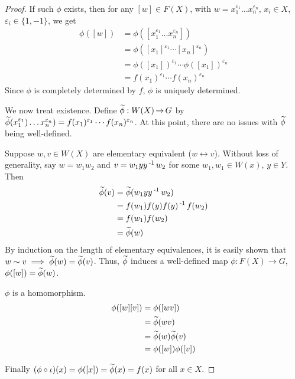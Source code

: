 \documentclass[11pt]{book}
\theoremstyle{definition}   \newtheorem{defn}[counter]{Definition} %
\newcommand{\ve}{\varepsilon}   \newcommand{\im}{\textnormal{im }}   \newcommand{\re}{\textnormal{Re }}   \newcommand{\mb}[1]{\mathbf{#1}}
\newcommand{\lra}{\leftrightarrow}   \newcommand{\0}{\mathbf{0}}   \newcommand{\mc}[1]{\mathcal{#1}}   \newcommand{\hra}{\hookrightarrow}   \newcommand{\hla}{\hookleftarrow}
\DeclareMathOperator{\ra}{\rightarrow}   \DeclareMathOperator{\Poly}{\mathbf{P}}   \DeclareMathOperator{\spn}{\textnormal{span}}   \DeclareMathOperator{\aut}{\textnormal{Aut}}
\newcommand{\vs}{\vspace{8pt}}
\numberwithin{counter}{chapter}
\begin{document}
\begin{proof}
If such $\phi$ exists, then for any $[w] \in F(X)$, with $w = x_1^{\ve_1} \dots x_n^{\ve_n}$, $x_i \in X$, $\ve_i \in \{1,-1\}$, we get
	\begin{align*}
	\phi([w]) &= \phi([x_1^{\ve_1} \dots x_n^{\ve_n}]) \\
	&= \phi([x_1]^{\ve_1} \cdots [x_n]^{\ve_n}) \\
	&= \phi([x_1])^{\ve_1} \cdots \phi([x_1])^{\ve_n} \\
	&= f(x_1)^{\ve_1} \cdots f(x_n)^{\ve_n}
	\end{align*}
Since $\phi$ is completely determined by $f$, $\phi$ is uniquely determined.

We now treat existence. Define $\wt{\phi} : W(X) \ra G$ by $\wt{\phi}(x_1^{\ve_1}) \dots x_n^{\ve_n}) = f(x_1)^{\ve_1} \cdots f(x_n)^{\ve_n}$. At this point, there are no issues with $\widetilde{\phi}$ being well-defined.

Suppose $w, v \in W(X)$ are elementary equivalent ($w \lra v$). Without loss of generality, say $w = w_1 w_2$ and $v = w_1 y y\operatorname{^{-1}} w_2$ for some $w_1,w_1 \in W(x)$, $y \in Y$. Then
	\begin{align*}
	\widetilde{\phi}(v) &= \widetilde{\phi}(w_1 y y\operatorname{^{-1}} w_2) \\
	&= f(w_1) f(y) f(y)\operatorname{^{-1}} f(w_2) \\
	&= f(w_1) f(w_2) \\
	&= \widetilde{\phi}(w)
	\end{align*}
By induction on the length of elementary equivalences, it is easily shown that $w \sim v \implies \widetilde{\phi}(w) = \widetilde{\phi}(v)$. Thus, $\widetilde{\phi}$ induces a well-defined map $\phi : F(X) \ra G$, $\phi([w]) = \widetilde{\phi}(w)$.

$\phi$ is a homomorphism.
	\begin{align*}
	\phi([w][v]) &= \phi([wv]) \\
	&= \widetilde{\phi}(wv) \\
	&= \widetilde{\phi}(w) \widetilde{\phi}(v) \\
	&= \phi([w]) \phi([v])
	\end{align*}

Finally $(\phi \circ \iota)(x) = \phi([x]) = \widetilde{\phi}(x) = f(x)$ for all $x \in X$.
\end{proof}

\vs
\end{document}
